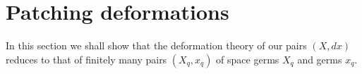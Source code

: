 \documentclass[11pt,twoside]{amsart}
\theoremstyle{plain}
\newtheorem{definition}[theorem]{Definition}
\newcommand{\Sm}{\mathcal{S}}
\newcommand{\Tm}{\mathcal{T}}
\newcommand{\Sh}[1]{\mathcal{#1}} %
\newcommand{\dfx}{dx}
\begin{document}
%
%
\section{Patching deformations}\label{sec:patching}
In this section we shall show that the deformation theory of our pairs $(X,\dfx)$ reduces to that of finitely many pairs $(X_q, x_q)$ of space germs $X_q$ and germs $x_q$. 
\end{document}
